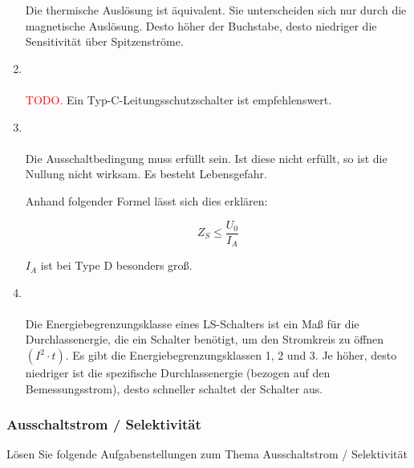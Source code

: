 \begin{enumerate}
            Die thermische Auslösung ist äquivalent. Sie unterscheiden sich nur durch die magnetische Auslösung.
            Desto höher der Buchstabe, desto niedriger die Sensitivität über Spitzenströme.

    \clearpage

    \item   {} \\\\
            \textcolor{red}{TODO.} Ein Typ-C-Leitungsschutzschalter ist empfehlenswert.

    \item   {} \\\\
            Die Ausschaltbedingung muss erfüllt sein. Ist diese nicht erfüllt, so ist die Nullung nicht wirksam. Es besteht Lebensgefahr.

            Anhand folgender Formel lässt sich dies erklären:

            $$Z_S \le \frac{U_0}{I_A}$$

            $I_A$ ist bei Type D besonders groß. 

    \item   {} \\\\
            Die Energiebegrenzungsklasse eines LS-Schalters ist ein Maß für die Durchlassenergie, die ein Schalter benötigt, um den Stromkreis zu öffnen $\left(I^2\cdot t\right)$.
            Es gibt die Energiebegrenzungsklassen 1, 2 und 3. Je höher, desto niedriger ist die spezifische Durchlassenergie (bezogen auf den Bemessungsstrom), desto schneller schaltet der Schalter aus.         
\end{enumerate}

\subsubsection{Ausschaltstrom / Selektivität}
Lösen Sie folgende Aufgabenstellungen zum Thema Ausschaltstrom / Selektivität

